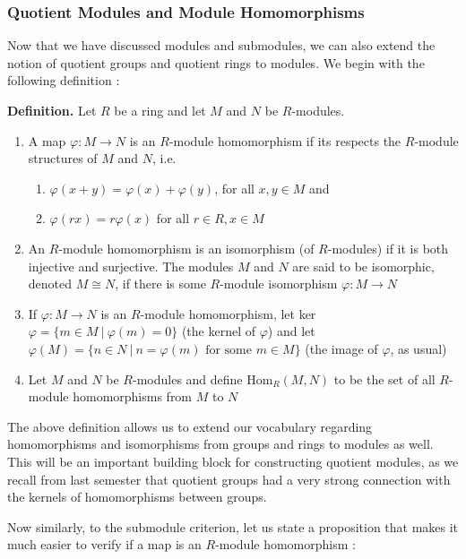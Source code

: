 \documentclass[11pt, reqno]{amsart}
\theoremstyle{plain}
\theoremstyle{definition}
\theoremstyle{example}
\begin{document}
\subsubsection{Quotient Modules and Module Homomorphisms}

Now that we have discussed modules and submodules, we can also extend the notion of quotient groups and quotient rings to modules. We begin with the following definition \cite[\S 10.2, p. 345]{dummit}:

\par
\textbf{Definition.} Let $R$ be a ring and let $M$ and $N$ be $R$-modules.
\begin{enumerate}
\item A map $\varphi: M \to N$ is an $R$-module homomorphism if its respects the $R$-module structures of $M$ and $N$, i.e.
\begin{enumerate}[label=\alph*)]
\item $\varphi(x + y) = \varphi(x) + \varphi(y)$, for all $x, y \in M$ and
\item $\varphi(rx) = r\varphi(x)$ for all $r \in R, x \in M$
\end{enumerate}

\item An $R$-module homomorphism is an isomorphism (of $R$-modules) if it is both injective and surjective. The modules $M$ and $N$ are said to be isomorphic, denoted $M \cong N$, if there is some $R$-module isomorphism $\varphi: M \to N$
\item If $\varphi: M \to N$ is an $R$-module homomorphism, let ker $\varphi = \{m \in M \ | \ \varphi(m) = 0\}$ (the kernel of $\varphi$) and let $\varphi(M) = \{n \in N \ | \ n = \varphi(m) \text{ for some } m \in M\}$ (the image of $\varphi$, as usual)

\item Let $M$ and $N$ be $R$-modules and define $\text{Hom}_R(M,N)$ to be the set of all $R$-module homomorphisms from $M$ to $N$
\end{enumerate}

The above definition allows us to extend our vocabulary regarding homomorphisms and isomorphisms from groups and rings to modules as well. This will be an important building block for constructing quotient modules, as we recall from last semester that quotient groups had a very strong connection with the kernels of homomorphisms between groups.

\par
Now similarly, to the submodule criterion, let us state a proposition that makes it much easier to verify if a map is an $R$-module homomorphism \cite[\S 10.2, p. 346]{dummit}:
\end{document}
